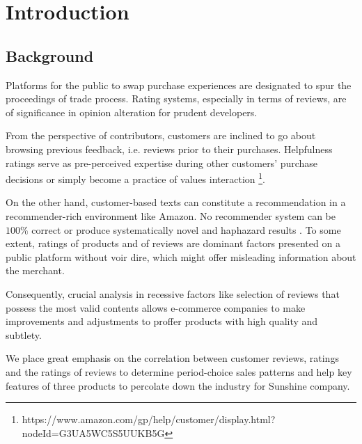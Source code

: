 \documentclass[12pt]{article}%
\begin{document}
\fontsize{13}{12.5}\selectfont
\setmainfont{TeX Gyre Pagella}    
\pagestyle{fancy} 
\chead{}  \lfoot{}	%
\cfoot{\thepage}
\rfoot{}

\section{Introduction}	
\subsection{Background}
Platforms for the public to swap purchase experiences are designated to spur the proceedings of trade process. Rating systems, especially in terms of reviews, are of significance in opinion alteration for prudent developers.
	
From the perspective of contributors, customers are inclined to go about browsing previous feedback, i.e. reviews prior to their purchases. Helpfulness ratings serve as pre-perceived expertise during other customers’ purchase decisions or simply become a practice of values interaction \footnote{\quad https://www.amazon.com/gp/help/customer/display.html?nodeId=G3UA5WC5S5UUKB5G}.

On the other hand, customer-based texts can constitute a recommendation in a recommender-rich environment like Amazon. No recommender system can be $100\%$ correct or produce systematically novel and haphazard results\cite{bib:1, bib:2} . To some extent, ratings of products and of reviews are dominant factors presented on a public platform without voir dire, which might offer misleading information about the merchant.

 Consequently, crucial analysis in recessive factors like selection of reviews that possess the most valid contents allows e-commerce companies to make improvements and adjustments to proffer products with high quality and subtlety\cite{amsu}.
 
We place great emphasis on the correlation between customer reviews, ratings and the ratings of reviews to determine period-choice sales patterns and help key features of three products to percolate down the industry for Sunshine company.
\end{document}
